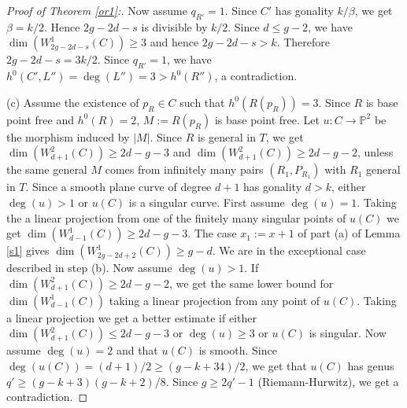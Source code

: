 \documentclass{amsart}
\theoremstyle{plain}
\theoremstyle{definition}
\begin{document}
\begin{proof}[Proof of Theorem \ref{or1}:]
Now assume $q_{R'}=1$. Since $C'$ has gonality $k/\beta$, we get $\beta =k/2$. Hence $2g-2d-s$ is divisible by $k/2$. Since $d\le g-2$, we have $\dim (W^1_{2g-2d-s}({C})) \ge 3$ and hence $2g-2d-s >k$. Therefore $2g-2d-s=3k/2$. Since $q_{R'}=1$, we have $h^0(C',L'') = \deg (L'') = 3 > h^0(R'')$, a contradiction.


\quad ({c}) Assume the existence of $p_R\in C$ such that  $h^0(R(p_R)) =3$. Since $R$ is base point free and $h^0({R}) =2$, $M:= R(p_R)$ is base point free. Let $u: C\to \mathbb {P}^2$ be the morphism induced by $|M|$. Since $R$ is general in $T$, we get $\dim (W^2_{d+1}({C})) \ge 2d-g-3$ and $\dim (W^2_{d+1}({C})) \ge 2d-g-2$, unless the
same general $M$ comes from infinitely many pairs $(R_1,P_{R_1})$ with $R_1$ general in $T$.
 Since a smooth plane curve of degree $d+1$ has gonality $d>k$,
either $\deg (u) >1$ or $u({C})$ is a singular curve. First assume $\deg (u)=1$. Taking the a linear projection from one of the finitely many singular points of $u({C})$ we get $\dim (W^1_{d-1}({C})) \ge 2d-g-3$. The case $x_1:= x+1$ of part (a) of Lemma \ref{s1} gives $\dim (W^1_{2g-2d+2}({C})) \ge g-d$.
We are in the exceptional case described in step (b). Now assume $\deg (u)>1$. If  $\dim (W^2_{d+1}({C})) \ge 2d-g-2$, we get the same lower bound for $\dim (W^1_{d-1}({C}))$
taking a linear projection from any point of $u({C})$. Taking a linear projection we get a better estimate if either $\dim (W^2_{d+1}({C})) \le 2d-g-3$ or $\deg (u)\ge 3$
or $u({C})$ is singular. Now assume $\deg (u) =2$ and that $u({C})$ is smooth. Since $\deg (u({C})) =(d+1)/2 \ge (g-k+34)/2$,
we get that $u({C})$ has genus $q' \ge  (g-k+3)(g-k+2)/8$. Since $g \ge 2q'-1$ (Riemann-Hurwitz), we get a contradiction.


\end{proof}
\end{document}
